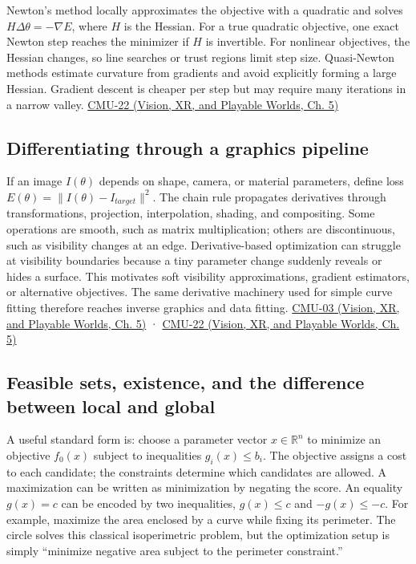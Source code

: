Newton's method locally approximates the objective with a quadratic and solves \(H\Delta\theta=-\nabla E\), where \(H\) is the Hessian. For a true quadratic objective, one exact Newton step reaches the minimizer if \(H\) is invertible. For nonlinear objectives, the Hessian changes, so line searches or trust regions limit step size. Quasi-Newton methods estimate curvature from gradients and avoid explicitly forming a large Hessian. Gradient descent is cheaper per step but may require many iterations in a narrow valley. \href{../07-Vision-XR-and-Playable-Worlds/main.pdf\#nameddest=04-visual-computing-ii-ch036-cmu-22---optimization}{CMU-22 (Vision, XR, and Playable Worlds, Ch. 5)}

\subsection{Differentiating through a graphics pipeline}\label{04-visual-computing-ii-ch029-differentiating-through-a-graphics-pipeline}

If an image \(I(\theta)\) depends on shape, camera, or material parameters, define loss \(E(\theta)=\|I(\theta)-I_{target}\|^2\). The chain rule propagates derivatives through transformations, projection, interpolation, shading, and compositing. Some operations are smooth, such as matrix multiplication; others are discontinuous, such as visibility changes at an edge. Derivative-based optimization can struggle at visibility boundaries because a tiny parameter change suddenly reveals or hides a surface. This motivates soft visibility approximations, gradient estimators, or alternative objectives. The same derivative machinery used for simple curve fitting therefore reaches inverse graphics and data fitting. \href{../07-Vision-XR-and-Playable-Worlds/main.pdf\#nameddest=04-visual-computing-ii-ch036-cmu-03---vector-calculus-preview}{CMU-03 (Vision, XR, and Playable Worlds, Ch. 5)} · \href{../07-Vision-XR-and-Playable-Worlds/main.pdf\#nameddest=04-visual-computing-ii-ch036-cmu-22---optimization}{CMU-22 (Vision, XR, and Playable Worlds, Ch. 5)}

\subsection{Feasible sets, existence, and the difference between local and global}\label{04-visual-computing-ii-ch029-feasible-sets-existence-and-the-difference-between-local-and-global}

A useful standard form is: choose a parameter vector \(x\in\mathbb R^n\) to minimize an objective \(f_0(x)\) subject to inequalities \(g_i(x)\le b_i\). The objective assigns a cost to each candidate; the constraints determine which candidates are allowed. A maximization can be written as minimization by negating the score. An equality \(g(x)=c\) can be encoded by two inequalities, \(g(x)\le c\) and \(-g(x)\le -c\). For example, maximize the area enclosed by a curve while fixing its perimeter. The circle solves this classical isoperimetric problem, but the optimization setup is simply ``minimize negative area subject to the perimeter constraint.''


